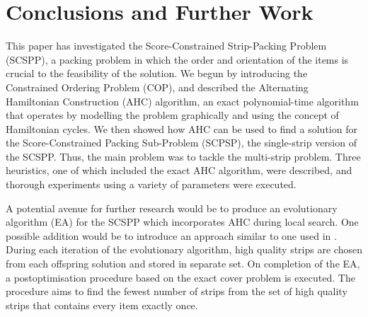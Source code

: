 \documentclass[runningheads]{llncs}
\begin{document}
\section{Conclusions and Further Work}
\label{sec:conclusion}
This paper has investigated the Score-Constrained Strip-Packing Problem (SCSPP), a packing problem in which the order and orientation of the items is crucial to the feasibility of the solution. We begun by introducing the Constrained Ordering Problem (COP), and described the Alternating Hamiltonian Construction (AHC) algorithm, an exact polynomial-time algorithm that operates by modelling the problem graphically and using the concept of Hamiltonian cycles. We then showed how AHC can be used to find a solution for the Score-Constrained Packing Sub-Problem (SCPSP), the single-strip version of the SCSPP. Thus, the main problem was to tackle the multi-strip problem. Three heuristics, one of which included the exact AHC algorithm, were described, and thorough experiments using a variety of parameters were executed. 

A potential avenue for further research would be to produce an evolutionary algorithm (EA) for the SCSPP which incorporates AHC during local search. One possible addition would be to introduce an approach similar to one used in \cite{malaguti2008}. During each iteration of the evolutionary algorithm, high quality strips are chosen from each offspring solution and stored in separate set. On completion of the EA, a postoptimisation procedure based on the exact cover problem is executed. The procedure aims to find the fewest number of strips from the set of high quality strips that contains every item exactly once. 







\end{document}

